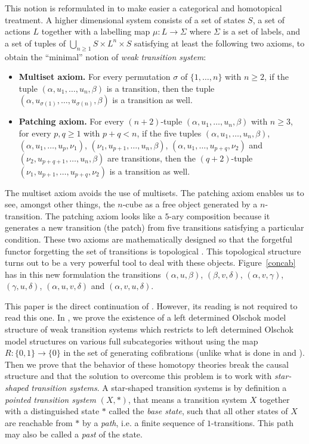 \documentclass[a4paper,12pt]{amsart}
\begin{document}
This notion is reformulated in \cite{hdts} to make easier a
categorical and homotopical treatment. A higher dimensional system
consists of a set of states $S$, a set of actions $L$ together with a
labelling map $\mu:L\to \Sigma$ where $\Sigma$ is a set of labels, and
a set of tuples of $\bigcup_{n{\geqslant} 1} S \times L^n \times S$ satisfying at
least the following two axioms, to obtain the ``minimal'' notion of
\emph{weak transition system}:
\begin{itemize}
\item \textbf{Multiset axiom.} For every permutation $\sigma$ of
  $\{1,\dots,n\}$ with $n{\geqslant} 2$, if the tuple
  $(\alpha,u_1,\dots,u_n,\beta)$ is a transition, then the tuple
  $(\alpha,u_{\sigma(1)}, \dots, u_{\sigma(n)}, \beta)$ is a
  transition as well.
\item \textbf{Patching axiom.} For every $(n+2)$-tuple
  $(\alpha,u_1,\dots,u_n,\beta)$ with $n{\geqslant} 3$, for every $p,q{\geqslant} 1$
  with $p+q<n$, if the five tuples $(\alpha,u_1, \dots, u_n, \beta)$,
  $(\alpha,u_1, \dots, u_p, \nu_1)$, $(\nu_1, u_{p+1}, \dots, u_n,
  \beta)$, $(\alpha, u_1, \dots, u_{p+q}, \nu_2)$ and $(\nu_2,
  u_{p+q+1}, \dots, u_n, \beta)$ are transitions, then the
  $(q+2)$-tuple $(\nu_1, u_{p+1}, \dots, u_{p+q}, \nu_2)$ is a
  transition as well.
\end{itemize}
The multiset axiom avoids the use of multisets. The patching axiom
enables us to see, amongst other things, the $n$-cube as a free object
generated by a $n$-transition. The patching axiom looks like a $5$-ary
composition because it generates a new transition (the patch) from
five transitions satisfying a particular condition. These two axioms
are mathematically designed so that the forgetful functor forgetting
the set of transitions is topological \cite{hdts}. This topological
structure turns out to be a very powerful tool to deal with these
objects.  Figure~\ref{concab} has in this new formulation the
transitions $(\alpha,u,\beta)$, $(\beta,v,\delta)$,
$(\alpha,v,\gamma)$, $(\gamma,u,\delta)$, $(\alpha,u,v,\delta)$ and
$(\alpha,v,u,\delta)$.

This paper is the direct continuation of \cite{biscsts1}. However, its
reading is not required to read this one. In \cite{biscsts1}, we prove
the existence of a left determined Olschok model structure of weak
transition systems which restricts to left determined Olschok model
structures on various full subcategories without using the map
$R:\{0,1\}\to \{0\}$ in the set of generating cofibrations (unlike
what is done in \cite{cubicalhdts} and \cite{csts}). Then we prove
that the behavior of these homotopy theories break the causal
structure and that the solution to overcome this problem is to work
with \emph{star-shaped transition systems}. A star-shaped transition
systems is by definition a \emph{pointed transition system} $(X,*)$,
that means a transition system $X$ together with a distinguished state
$*$ called the \emph{base state}, such that all other states of $X$
are reachable from $*$ by a \emph{path}, i.e. a finite sequence of
$1$-transitions. This path may also be called a \emph{past} of the
state.
\end{document}
